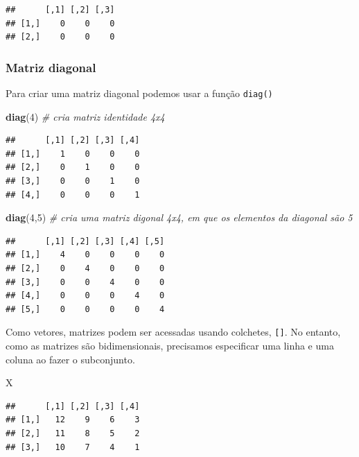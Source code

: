\documentclass[
]{book}
\newenvironment{Shaded}{\begin{snugshade}}{\end{snugshade}}
\newcommand{\CommentTok}[1]{\textcolor[rgb]{0.56,0.35,0.01}{\textit{#1}}}
\newcommand{\DecValTok}[1]{\textcolor[rgb]{0.00,0.00,0.81}{#1}}
\newcommand{\KeywordTok}[1]{\textcolor[rgb]{0.13,0.29,0.53}{\textbf{#1}}}
\newcommand{\NormalTok}[1]{#1}
\theoremstyle{definition}
\theoremstyle{definition}
\theoremstyle{definition}
\theoremstyle{remark}
\begin{document}
\begin{verbatim}
##      [,1] [,2] [,3]
## [1,]    0    0    0
## [2,]    0    0    0
\end{verbatim}

\hypertarget{matriz-diagonal}{%
\subsubsection{Matriz diagonal}\label{matriz-diagonal}}

Para criar uma matriz diagonal podemos usar a função \texttt{diag()}

\begin{Shaded}
\begin{Highlighting}[]
\KeywordTok{diag}\NormalTok{(}\DecValTok{4}\NormalTok{)   }\CommentTok{# cria matriz identidade 4x4}
\end{Highlighting}
\end{Shaded}

\begin{verbatim}
##      [,1] [,2] [,3] [,4]
## [1,]    1    0    0    0
## [2,]    0    1    0    0
## [3,]    0    0    1    0
## [4,]    0    0    0    1
\end{verbatim}

\begin{Shaded}
\begin{Highlighting}[]
\KeywordTok{diag}\NormalTok{(}\DecValTok{4}\NormalTok{,}\DecValTok{5}\NormalTok{) }\CommentTok{# cria uma matriz digonal 4x4, em que os elementos da diagonal são 5}
\end{Highlighting}
\end{Shaded}

\begin{verbatim}
##      [,1] [,2] [,3] [,4] [,5]
## [1,]    4    0    0    0    0
## [2,]    0    4    0    0    0
## [3,]    0    0    4    0    0
## [4,]    0    0    0    4    0
## [5,]    0    0    0    0    4
\end{verbatim}

Como vetores, matrizes podem ser acessadas usando colchetes, \texttt{{[}{]}}. No entanto, como as matrizes são bidimensionais, precisamos especificar uma linha e uma coluna ao fazer o subconjunto.

\begin{Shaded}
\begin{Highlighting}[]
\NormalTok{X}
\end{Highlighting}
\end{Shaded}

\begin{verbatim}
##      [,1] [,2] [,3] [,4]
## [1,]   12    9    6    3
## [2,]   11    8    5    2
## [3,]   10    7    4    1
\end{verbatim}
\end{document}
